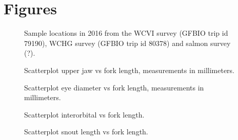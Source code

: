 \documentclass[12pt]{article}\usepackage[]{graphicx}\usepackage[]{color}
\begin{document}
\hypertarget{figures}{%
\section{Figures}\label{figures}}


\begin{figure}[htb]

{\centering {} 

}

\caption{Sample locations in 2016 from the WCVI survey (GFBIO trip id 79190), WCHG survey (GFBIO trip id 80378) and salmon survey (?).}\label{fig:figure1}
\end{figure}

\begin{figure}[htb]

{\centering {} 

}

\caption{Scatterplot upper jaw vs fork length, measurements in millimeters.}\label{fig:figure2}
\end{figure}

\begin{figure}[htb]

{\centering {} 

}

\caption{Scatterplot eye diameter vs fork length, measurements in millimeters.}\label{fig:figure3}
\end{figure}

\begin{figure}[htb]

{\centering {} 

}

\caption{Scatterplot interorbital vs fork length.}\label{fig:figure4}
\end{figure}

\begin{figure}[htb]

{\centering {} 

}

\caption{Scatterplot snout length vs fork length.}\label{fig:figure5}
\end{figure}
\end{document}

